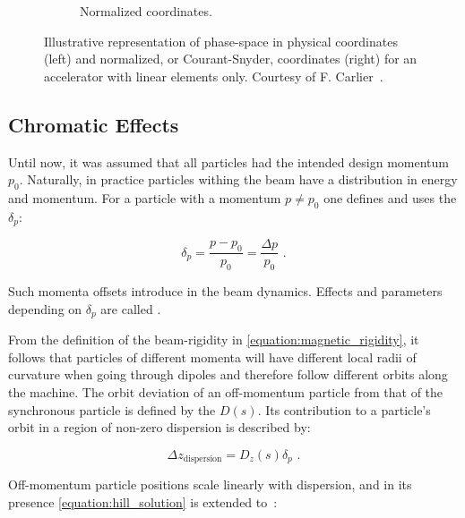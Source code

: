 \begin{figure}[!hbt]
\begin{subfigure}[b]{0.475\textwidth}
        \caption{Normalized coordinates.}
        \label{fig:phase_space_normalized}
    \end{subfigure}
    \caption{Illustrative representation of phase-space in physical coordinates (left) and normalized, or Courant-Snyder, coordinates (right) for an accelerator with linear elements only. Courtesy of F. Carlier~\cite{PHD:Carlier}.}
    \label{figure:phase_space_linear_physical_normalized_coordinates}
\end{figure}

\subsection{Chromatic Effects}
\label{subsection:chromatic_effects}

Until now, it was assumed that all particles had the intended design momentum \(p_{0}\).
Naturally, in practice particles withing the beam have a distribution in energy and momentum.
For a particle with a momentum \(p \neq p_{0}\) one defines and uses the  \(\delta_p\):

\begin{equation}
    \delta_p = \frac{p - p_0}{p_0} = \frac{\Delta p}{p_0} \text{ .}
    \label{equation:momentum_deviation}
\end{equation}

Such momenta offsets introduce  in the beam dynamics.
Effects and parameters depending on \(\delta_p\) are called .

From the definition of the \gls{beam-rigidity} in \cref{equation:magnetic_rigidity}, it follows that particles of different momenta will have different local radii of curvature when going through dipoles and therefore follow different orbits along the machine.
The orbit deviation of an off-momentum particle from that of the synchronous particle is defined by the  \(D(s)\).
Its contribution to a particle's orbit in a region of non-zero dispersion is described by:

\begin{equation}
    \Delta z_{\mathrm{dispersion}} = D_z(s) \delta_p \text{ .}
    \label{equation:dispersion_contribution_to_orbit}
\end{equation}
\bigbreak

Off-momentum particle positions scale linearly with dispersion, and in its presence \cref{equation:hill_solution} is extended to~\cite{BOOK:Wiedemann:Particle_Accelerator_Physics}:

